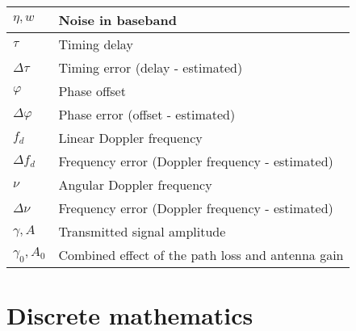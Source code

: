 \documentclass{article}
\begin{document}
\begin{xltabular}{\textwidth}{XX}
    \(\eta, w\) & Noise in baseband\\ \hline
    \(\tau\) & Timing delay \\ \hline
    \(\Delta\tau\) & Timing error (delay - estimated) \\ \hline
    \(\varphi\) & Phase offset \\ \hline
    \(\Delta\varphi\) & Phase error (offset - estimated) \\ \hline
    \(f_d\) & Linear Doppler frequency\\ \hline
    \(\Delta f_d\) & Frequency error (Doppler frequency - estimated)\\ \hline
    \(\nu\) & Angular Doppler frequency\\ \hline
    \(\Delta \nu\) & Frequency error (Doppler frequency - estimated)\\ \hline
    \(\gamma, A\) & Transmitted signal amplitude\\ \hline
    \(\gamma_0, A_0\) & Combined effect of the path loss and antenna gain
\end{xltabular}

\section{Discrete mathematics}
\end{document}
